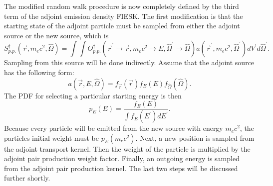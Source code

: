 The modified random walk procedure is now completely defined by the third
term of the adjoint emission density FIESK. The first modification is that 
the starting state of the adjoint particle must be sampled from either the 
adjoint source or the new source, which is
\begin{equation}
  S_{p.p.}^{\dagger}(\vec{r},m_ec^2,\hat{\Omega}) =
  \int\int O_{p.p.}^{\dagger}(\vec{r}^{'} \to \vec{r}, m_ec^2 \to E, \hat{\Omega}^{'}
  \to \hat{\Omega}) a(\vec{r}^{'},m_ec^2,\hat{\Omega}^{'}) 
  dV^{'}d\hat{\Omega}^{'}.
\end{equation}
Sampling from this source will be done indirectly. Assume that the adjoint
source has the following form:
\begin{equation*}
  a(\vec{r},E,\hat{\Omega}) = f_{\vec{r}}(\vec{r})f_E(E)
  f_{\hat{\Omega}}(\hat{\Omega}).
 \end{equation*}
The PDF for selecting a particular starting energy is then
\begin{equation*}
  p_E(E) = \frac{f_E(E)}{\int f_E(E^{'})dE^{'}}.
\end{equation*}
Because every particle will be emitted from the new source with energy
$m_ec^2$, the particles initial weight must be $p_E(m_ec^2)$. Next, a new
position is sampled from the adjoint transport kernel. Then the weight of the 
particle is multiplied by the adjoint pair production weight factor. Finally, 
an outgoing energy is sampled from the adjoint pair production kernel. The
last two steps will be discussed further shortly.

